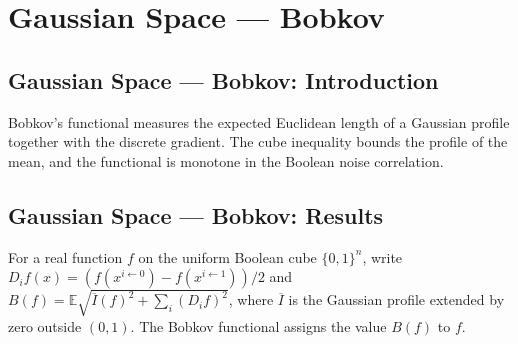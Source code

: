\section{Gaussian Space --- Bobkov}
\subsection*{Gaussian Space --- Bobkov: Introduction}
Bobkov's functional measures the expected Euclidean length of a Gaussian profile together with the discrete gradient. The cube inequality bounds the profile of the mean, and the functional is monotone in the Boolean noise correlation.

\subsection*{Gaussian Space --- Bobkov: Results}

\begin{definition}
\leanok
{}
For a real function $f$ on the uniform Boolean cube $\{0,1\}^n$, write $D_i f(x)=(f(x^{i\leftarrow0})-f(x^{i\leftarrow1}))/2$ and $B(f)=\mathbb E\sqrt{\overline I(f)^2+\sum_i(D_i f)^2}$, where $\overline I$ is the Gaussian profile extended by zero outside $(0,1)$. The Bobkov functional assigns the value $B(f)$ to $f$.
\end{definition}

